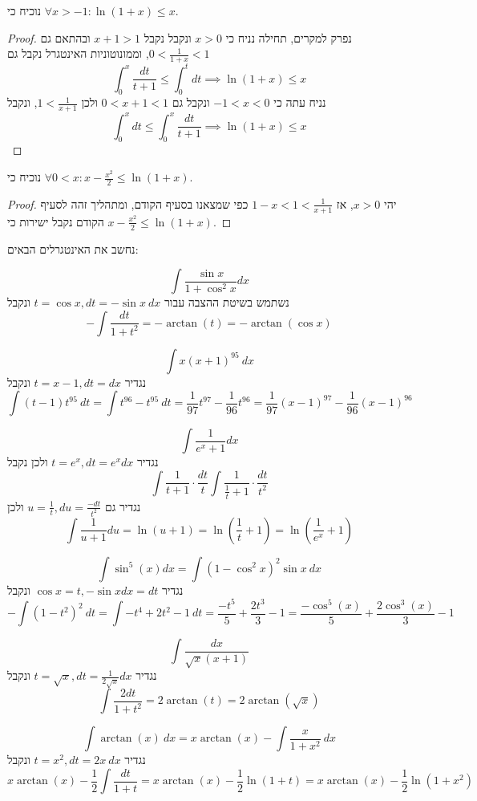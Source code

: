 \Subquestion{} 
נוכיח כי $\forall x > -1 : \ln(1 + x) \le x$.
\begin{proof}
	נפרק למקרים, תחילה נניח כי $x > 0$ ונקבל נקבל $x + 1 > 1$ ובהתאם גם $0 < \frac{1}{1 + x} < 1$, וממונוטוניות האינטגרל נקבל גם
	\[
		\int_{0}^{x} \frac{dt}{t + 1} \le \int_{0}^{t} dt
		\implies \ln(1 + x) \le x
	\]
	נניח עתה כי $-1 < x < 0$ ונקבל גם $0 < x + 1 < 1$ ולכן $1 < \frac{1}{x + 1}$, ונקבל
	\[
		\int_{0}^{x} dt \le \int_{0}^{x} \frac{dt}{t + 1}
		\implies \ln(1 + x) \le x
	\]
\end{proof}

\Subquestion{}
נוכיח כי $\forall 0 < x : x - \frac{x^2}{2} \le \ln(1 + x)$.
\begin{proof}
	יהי $x > 0$, אז $1 - x < 1 < \frac{1}{x + 1}$ כפי שמצאנו בסעיף הקודם, ומתהליך זהה לסעיף הקודם נקבל ישירות כי $x - \frac{x^2}{2} \le \ln(1 + x)$.
\end{proof}

\Question{}
נחשב את האינטגרלים הבאים:

\Subquestion{}
\[
	\int \frac{\sin x}{1 + \cos^2 x} dx
\]
נשתמש בשיטת ההצבה עבור $t = \cos x, dt = -\sin x\ dx$ ונקבל
\[
	-\int \frac{dt}{1 + t^2} = -\arctan(t)
	= -\arctan(\cos x)
\]

\Subquestion{}
\[
	\int x {(x + 1)}^{95}\ dx
\]
נגדיר $t = x - 1, dt = dx$ ונקבל
\[
	\int (t - 1) t^{95}\ dt = \int t^{96} - t^{95}\ dt
	= \frac{1}{97} t^{97} - \frac{1}{96} t^{96}
	= \frac{1}{97} {(x - 1)}^{97} - \frac{1}{96} {(x - 1)}^{96}
\]

\Subquestion{}
\[
	\int \frac{1}{e^x + 1} dx
\]
נגדיר $t = e^x, dt = e^x dx$ ולכן נקבל
\[
	\int \frac{1}{t + 1} \cdot \frac{dt}{t}
	\int \frac{1}{\frac{1}{t} + 1} \cdot \frac{dt}{t^2}
\]
נגדיר גם $u = \frac{1}{t}, du = \frac{-dt}{t^2}$ ולכן
\[
	\int \frac{1}{u + 1} du = \ln(u + 1)
	= \ln(\frac{1}{t} + 1)
	= \ln(\frac{1}{e^x} + 1)
\]

\Subquestion{}
\[
	\int \sin^5(x) dx
	= \int {(1 - \cos^2 x)}^2 \sin x\ dx
\]
נגדיר $\cos x = t, -\sin x dx = dt$ ונקבל
\[
	-\int {(1 - t^2)}^2\ dt
	= \int -t^4 + 2t^2 - 1\ dt
	= \frac{-t^5}{5} + \frac{2t^3}{3} - 1
	= \frac{-\cos^5(x)}{5} + \frac{2\cos^3(x)}{3} - 1
\]

\Subquestion{}
\[
	\int \frac{dx}{\sqrt{x} (x + 1)}
\]
נגדיר $t = \sqrt{x}, dt = \frac{1}{2 \sqrt{x}}dx$ ונקבל
\[
	\int \frac{2dt}{1 + t^2}
	= 2 \arctan(t)
	= 2 \arctan(\sqrt{x})
\]

\Subquestion{}
\[
	\int \arctan(x)\ dx
	= x \arctan(x) - \int \frac{x}{1 + x^2}\ dx
\]
נגדיר $t = x^2, dt = 2x\ dx$ ונקבל
\[
	x \arctan(x) - \frac{1}{2} \int \frac{dt}{1 + t}
	= x \arctan(x) - \frac{1}{2}\ln(1 + t)
	= x \arctan(x) - \frac{1}{2}\ln(1 + x^2)
\]



